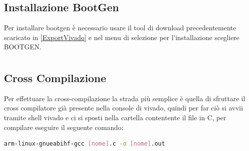 \chapter{}
\section{Installazione BootGen}
\label{installazioneBoot}
Per installare bootgen è necessario usare il tool di download precedentemente scaricato in \ref{ExportVivado} e nel menu di selezione per l'installazione scegliere BOOTGEN.


\chapter{}
\section{Cross Compilazione}
\label{crossComp}
Per effettuare la cross-compilazione la strada più semplice è quella di sfruttare il cross compilatore già presente nella console di vivado, quindi per far ciò si avvii tramite shell vivado e ci si sposti nella cartella contentente il file in C, per compilare eseguire il seguente comando:
\begin{lstlisting}[language=sh, label=lst:sh, caption={Cross-compilazione}]
arm-linux-gnueabihf-gcc [nome].c -o [nome].out
\end{lstlisting}



\chapter{}
